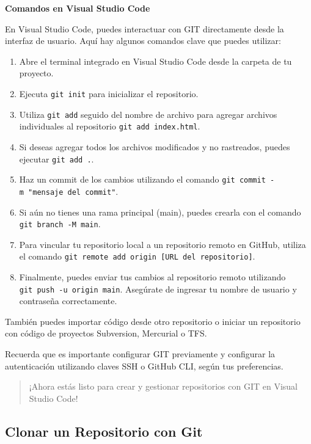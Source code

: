 \documentclass[
  a4paper,
]{article}
\providecommand{\tightlist}{%
  \setlength{\itemsep}{0pt}\setlength{\parskip}{0pt}}\usepackage{longtable,booktabs,array}
\begin{document}
\textbf{Comandos en Visual Studio Code}

En Visual Studio Code, puedes interactuar con GIT directamente desde la
interfaz de usuario. Aquí hay algunos comandos clave que puedes
utilizar:

\begin{enumerate}
\def\labelenumi{\arabic{enumi}.}
\tightlist
\item
  Abre el terminal integrado en Visual Studio Code desde la carpeta de
  tu proyecto.
\item
  Ejecuta \texttt{git\ init} para inicializar el repositorio.
\item
  Utiliza \texttt{git\ add} seguido del nombre de archivo para agregar
  archivos individuales al repositorio \texttt{git\ add\ index.html}.
\item
  Si deseas agregar todos los archivos modificados y no rastreados,
  puedes ejecutar \texttt{git\ add\ .}.
\item
  Haz un commit de los cambios utilizando el comando
  \texttt{git\ commit\ -m\ "mensaje\ del\ commit"}.
\item
  Si aún no tienes una rama principal (main), puedes crearla con el
  comando \texttt{git\ branch\ -M\ main}.
\item
  Para vincular tu repositorio local a un repositorio remoto en GitHub,
  utiliza el comando
  \texttt{git\ remote\ add\ origin\ {[}URL\ del\ repositorio{]}}.
\item
  Finalmente, puedes enviar tus cambios al repositorio remoto utilizando
  \texttt{git\ push\ -u\ origin\ main}. Asegúrate de ingresar tu nombre
  de usuario y contraseña correctamente.
\end{enumerate}

También puedes importar código desde otro repositorio o iniciar un
repositorio con código de proyectos Subversion, Mercurial o TFS.

Recuerda que es importante configurar GIT previamente y configurar la
autenticación utilizando claves SSH o GitHub CLI, según tus
preferencias.

\begin{quote}
¡Ahora estás listo para crear y gestionar repositorios con GIT en Visual
Studio Code!
\end{quote}

\subsection{Clonar un Repositorio con
Git}\label{clonar-un-repositorio-con-git}
\end{document}
